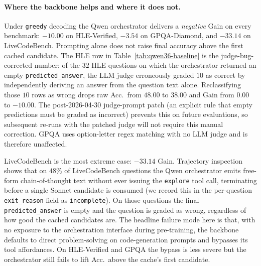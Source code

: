 \paragraph{Where the backbone helps and where it does not.} Under \texttt{greedy} decoding the Qwen orchestrator delivers a \emph{negative} Gain on every benchmark: $-10.00$ on HLE-Verified, $-3.54$ on GPQA-Diamond, and $-33.14$ on LiveCodeBench. Prompting alone does not raise final accuracy above the first cached candidate. The HLE row in Table~\ref{tab:qwen36-baseline} is the judge-bug-corrected number: of the $32$ HLE questions on which the orchestrator returned an empty \texttt{predicted\_answer}, the LLM judge erroneously graded $10$ as correct by independently deriving an answer from the question text alone. Reclassifying those $10$ rows as wrong drops raw Acc.\ from $48.00$ to $38.00$ and Gain from $0.00$ to $-10.00$. The post-2026-04-30 judge-prompt patch (an explicit rule that empty predictions must be graded as incorrect) prevents this on future evaluations, so subsequent re-runs with the patched judge will not require this manual correction. GPQA uses option-letter regex matching with no LLM judge and is therefore unaffected.

LiveCodeBench is the most extreme case: $-33.14$ Gain. Trajectory inspection shows that on $48\%$ of LiveCodeBench questions the Qwen orchestrator emits free-form chain-of-thought text without ever issuing the \texttt{explore} tool call, terminating before a single Sonnet candidate is consumed (we record this in the per-question \texttt{exit\_reason} field as \texttt{incomplete}). On those questions the final \texttt{predicted\_answer} is empty and the question is graded as wrong, regardless of how good the cached candidates are. The headline failure mode here is that, with no exposure to the orchestration interface during pre-training, the backbone defaults to direct problem-solving on code-generation prompts and bypasses its tool affordances. On HLE-Verified and GPQA the bypass is less severe but the orchestrator still fails to lift Acc.\ above the cache's first candidate.


